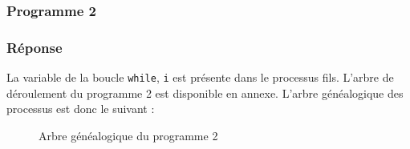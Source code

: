 \documentclass[
	12pt, %
]{fphw}
\begin{document}
\subsubsection*{Programme 2}
\begin{problem}
	
\end{problem}
\subsubsection*{Réponse}
La variable de la boucle \texttt{while}, \texttt{i} est présente dans le processus fils. 
L'arbre de déroulement du programme 2 est disponible en annexe.
L'arbre généalogique des processus est donc le suivant :
\begin{figure}[H]
\begin{center}
\end{center}
\caption{Arbre généalogique du programme 2}
\end{figure}
\newpage
\end{document}
